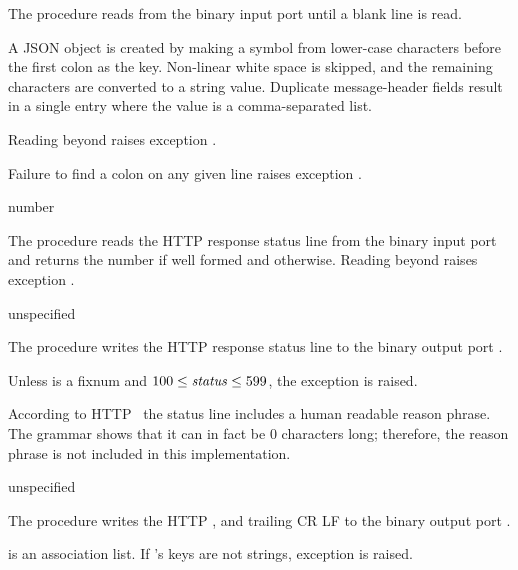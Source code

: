 The  procedure reads from the binary input
port  until a blank line is read.

A JSON object is created by making a symbol from lower-case characters
before the first colon as the key. Non-linear white space is skipped,
and the remaining characters are converted to a string
value. Duplicate message-header fields result in a single entry where
the value is a comma-separated list.

Reading beyond  raises exception
.

Failure to find a colon on any given line raises exception
.

\begin{procedure}
\end{procedure}
\returns{} number \alt{} 

The  procedure reads the HTTP response status
line from the binary input port  and returns the number if
well formed and  otherwise. Reading beyond 
raises exception .

\begin{procedure}
\end{procedure}
\returns{} unspecified

The  procedure writes the HTTP response
status line to the binary output port .

Unless  is a fixnum and $100 \leq \var{status} \leq 599$, the
exception  is
raised.

According to HTTP~\cite{RFC7230} the status line includes a human
readable reason phrase. The grammar shows that it can in fact be 0
characters long; therefore, the reason phrase is not included in this
implementation.

\begin{procedure}
\end{procedure}
\returns{} unspecified

The  procedure writes the HTTP ,
and trailing CR LF to the binary output port .

 is an association list. If 's keys are not
strings, exception 
is raised.

